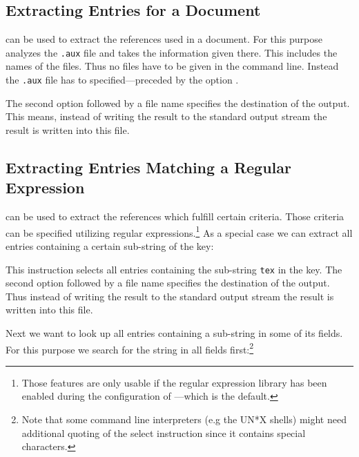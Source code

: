 \documentclass[11pt,a4paper]{scrbook}
\begin{document}
\subsection{Extracting Entries for a Document}\label{sample:extract}

\BibTool{} can be used to extract the references used in a document. For this
purpose \BibTool{} analyzes the \verb|.aux| file and takes the information
given there. This includes the names of the \BibTeX{} files. Thus no \BibTeX{}
files have to be given in the command line. Instead the \verb|.aux| file has
to specified---preceded by the option .


The second option  followed by a file name specifies the destination of
the output. This means, instead of writing the result to the standard output
stream the result is written into this file.

\subsection{Extracting Entries Matching a Regular Expression}

\BibTool{} can be used to extract the references which fulfill certain
criteria. Those criteria can be specified utilizing regular
expressions.\footnote{Those features are only usable if the regular expression
  library has been enabled during the configuration of \BibTool{}---which is
  the default.} As a special case we can extract all entries containing a
certain sub-string of the key:


This instruction selects all entries containing the sub-string \texttt{tex} in
the key. The second option  followed by a file name specifies the
destination of the output. Thus instead of writing the result to the standard
output stream the result is written into this file.

Next we want to look up all entries containing a sub-string in some of its
fields. For this purpose we search for the string in all fields
first:\footnote{Note that some command line interpreters (e.g the UN*X shells)
  might need additional quoting of the select instruction since it contains
  special characters.}

\end{document}
